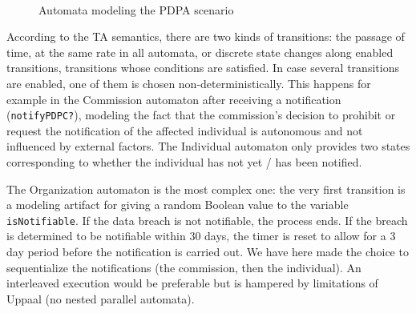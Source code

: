 \begin{figure}[htp]
\centering
{}\hfil
{}\\
\caption{Automata modeling the PDPA scenario}\label{fig:pdpa}
\end{figure}

According to the TA semantics, there are two kinds of transitions: the passage
of time, at the same rate in all automata, or discrete state changes along
enabled transitions, \ie transitions whose conditions are satisfied. In case
several transitions are enabled, one of them is chosen
non-deterministically. This happens for example in the Commission automaton
after receiving a notification (\texttt{notifyPDPC?}), modeling the fact that
the commission's decision to prohibit or request the notification of the
affected individual is autonomous and not influenced by external factors.
The Individual automaton only provides two states corresponding to whether the
individual has not yet / has been notified.

The Organization automaton is the
most complex one: the very first transition is a modeling artifact for giving
a random Boolean value to the variable \texttt{isNotifiable}. If the data
breach is not notifiable, the process ends. If the breach is determined to be
notifiable within 30 days, the timer is reset to allow for a 3 day period before
the notification is carried out. We have here made the choice to sequentialize
the notifications (the commission, then the individual). An interleaved execution
would be preferable but is hampered by limitations of Uppaal (no nested
parallel automata).


